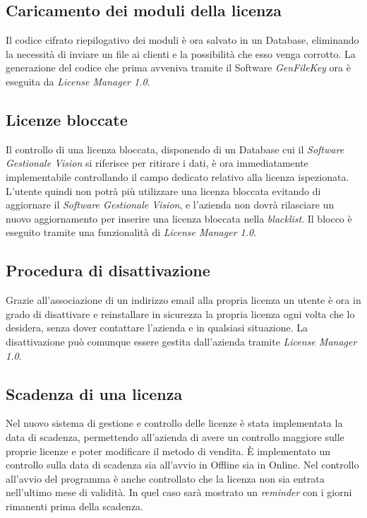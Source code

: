 \subsection{Caricamento dei moduli della licenza}

Il codice cifrato riepilogativo dei moduli è ora salvato in un Database, eliminando la necessità di inviare un file ai clienti e la possibilità che esso venga corrotto. La generazione del codice che prima avveniva tramite il Software \textit{GenFileKey} ora è eseguita da \textit{License Manager 1.0}.

\subsection{Licenze bloccate} 
Il controllo di una licenza bloccata, disponendo di un Database cui il \textit{Software Gestionale Vision} si riferisce per ritirare i dati, è ora immediatamente implementabile controllando il campo dedicato relativo alla licenza ispezionata. L'utente quindi non potrà più utilizzare una licenza bloccata evitando di aggiornare il \textit{Software Gestionale Vision}, e l'azienda non dovrà rilasciare un nuovo aggiornamento per inserire una licenza bloccata nella \textit{blacklist}.
Il blocco è eseguito tramite una funzionalità di \textit{License Manager 1.0}.

\subsection{Procedura di disattivazione}

Grazie all'associazione di un indirizzo email alla propria licenza un utente è ora in grado di disattivare e reinstallare in sicurezza la propria licenza ogni volta che lo desidera, senza dover contattare l’azienda e in qualsiasi situazione. La disattivazione può comunque essere gestita dall'azienda tramite \textit{License Manager 1.0}.

\subsection{Scadenza di una licenza}

Nel nuovo sistema di gestione e controllo delle licenze è stata implementata la data di scadenza, permettendo all'azienda di avere un controllo maggiore sulle proprie licenze e poter modificare il metodo di vendita. È implementato un controllo sulla data di scadenza sia all'avvio in Offline sia in Online. Nel controllo all’avvio del programma è anche controllato che la licenza non sia entrata nell’ultimo mese di validità. In quel caso sarà mostrato un \textit{reminder} con i giorni rimanenti prima della scadenza. 
 
